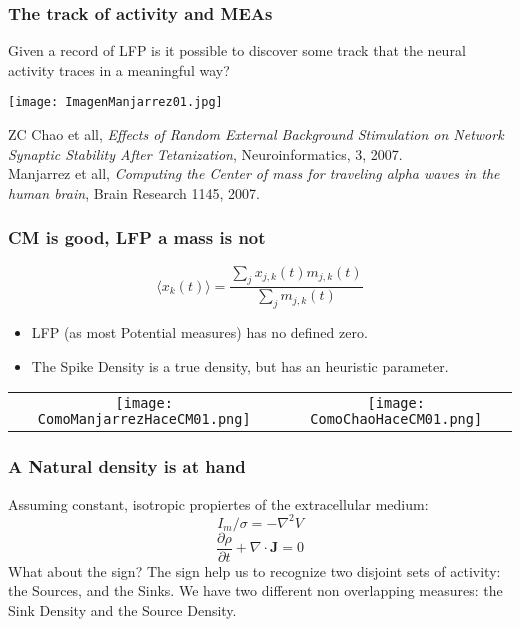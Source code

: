 \documentclass[serif]{beamer}
\begin{document}
\begin{frame}
    \frametitle{The track of activity and MEAs}
    Given a record of LFP is it possible to discover
    some track that the neural activity traces in a meaningful
    way?
    \begin{center}   
    \texttt{[image: ImagenManjarrez01.jpg]}
    \end{center}
    
    ZC Chao et all, \emph{Effects of Random External Background Stimulation
      on Network Synaptic Stability After Tetanization}, Neuroinformatics, 3, 2007.\\

    Manjarrez et all, \emph{Computing the Center of mass for traveling alpha waves in
  the human brain}, Brain Research 1145, 2007.   
  \end{frame}


   \begin{frame}
     \frametitle{CM is good, LFP a mass is not}
     \begin{equation}
       \langle x_k(t) \rangle =\frac{\sum_j x_{j,k} (t) m_{j,k} (t)} {\sum_j m_{j,k}(t)}
     \end{equation}   
     \begin{itemize}
       \item LFP (as most Potential measures) has no defined zero.
       \item The Spike Density is a true density, but has an heuristic parameter.
     \end{itemize}
    
     
     \begin{tabular}{ c c }
      \texttt{[image: ComoManjarrezHaceCM01.png]} &
       \texttt{[image: ComoChaoHaceCM01.png]} 
     \end{tabular}

    \end{frame}
  

  \begin{frame}
    \frametitle{A Natural density is at hand}
    Assuming constant, isotropic propiertes of the extracellular medium:
      \begin{equation}
       I_m/\sigma=-\nabla^2 V
      \end{equation}
      \begin{equation}
       \frac{\partial \rho}{\partial t} + \nabla \cdot \mathbf{J}=0 
      \end{equation}
      What about the sign?
      The sign help us to recognize two disjoint sets of activity:
      the Sources, and the Sinks.
      We have two different non overlapping measures: the
      Sink Density and the Source Density.
  \end{frame}
     
\end{document}
